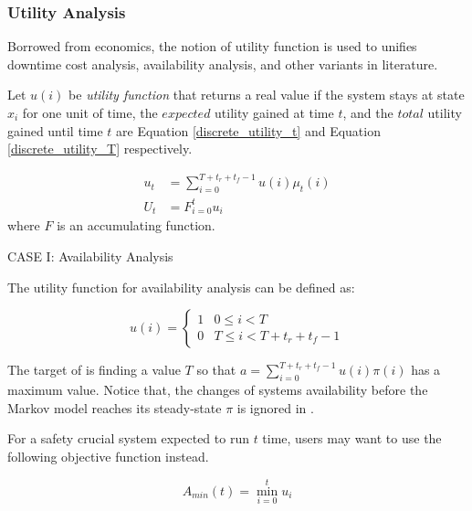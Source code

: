 \subsubsection{Utility Analysis}

Borrowed from economics, the notion of utility function is used to unifies
downtime cost analysis, availability analysis, and other variants in literature.

Let $u(i)$ be {\it utility function} that returns a real value if the system stays
at state $x_i$ for one unit of time, the $expected$ utility gained at time $t$,
and the $total$ utility gained until time $t$ are Equation \ref{discrete_utility_t}
and Equation \ref{discrete_utility_T} respectively.

\begin{subequations}
\label{discrete_utility}
\begin{align}
u_t  & =   \sum \limits_{i=0}^{T+t_r+t_f-1} u(i)\mu_t(i)  \label{discrete_utility_t}\\
U_t  & =  F_{i=0}^{t} u_i  \label{discrete_utility_T}
\end{align}
\end{subequations}
where $F$ is an accumulating function.


\newpage
CASE I: Availability Analysis

The utility function for availability analysis can be defined as:

\begin{equation}
\label{discrete_availability_utiliy}
u(i) =  \begin{cases}  1 & 0 \leq i < T \\
                       0 & T \leq i < T+t_r+t_f -1
\end{cases}
\end{equation}


The target of \citep{dohi2000statistical} is finding a value $T$ so that
$a = \sum \limits_{i=0}^{T+t_r+t_f-1} u(i)\pi(i) $ has a maximum value.
Notice that, the changes of systems availability before the Markov model 
reaches its steady-state $\pi$ is ignored in \citep{dohi2000statistical}.

For a safety crucial system expected to run $t$ time, users may want to use the 
following objective function instead.

\begin{equation}
\label{discrete_availability_minimum}
A_{min}(t) = \min_{i=0}^t u_i
\end{equation} 

